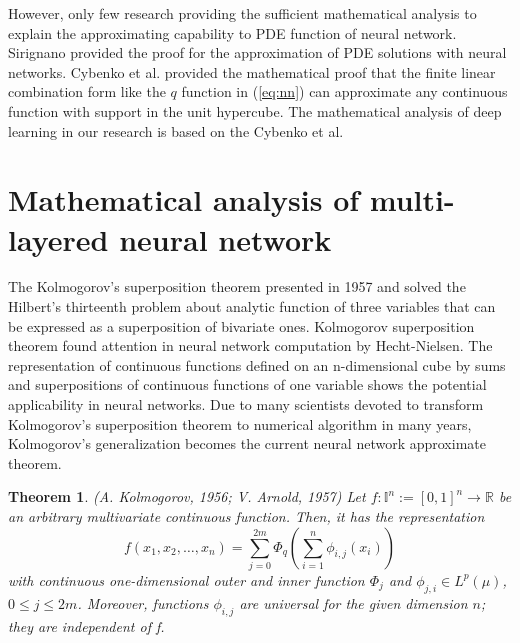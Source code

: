 \documentclass{article}
\newtheorem{theorem}{Theorem}[section]
\begin{document}
However, only few research providing the sufficient mathematical analysis to explain the approximating capability to PDE function of neural network. 
Sirignano \cite{sirignano} provided the proof for the approximation of PDE solutions with neural networks. 
Cybenko  et al.   \cite{cybenko} provided the mathematical proof that the finite linear combination form like the $q$ function in (\ref{eq:nn})
can approximate any continuous function with support in the unit hypercube.
The mathematical analysis of deep learning in our research is based on the Cybenko et al. 





\section{Mathematical analysis of multi-layered neural network}
 The Kolmogorov's superposition theorem presented in 1957 and solved the Hilbert's thirteenth problem \footnotemark about analytic function of three variables that can be expressed as a superposition of bivariate ones.
Kolmogorov superposition theorem found attention in neural network computation by Hecht{-}Nielsen\cite{nielsen}.
The representation of continuous functions defined on an n{-}dimensional cube by sums and superpositions of continuous functions of one variable shows the potential applicability in neural networks\cite{kurkova}.
Due to many scientists devoted to transform Kolmogorov's superposition theorem to numerical algorithm in many years,
Kolmogorov's generalization becomes the current neural network approximate theorem.


\begin{theorem}
	 (\textit{A. Kolmogorov, 1956; V. Arnold, 1957}) Let $f : \mathbb{I}^{n} := [0,1]^{n} \rightarrow\mathbb{R}$ be an arbitrary multivariate continuous function. Then, it has the representation
	 \begin{equation}
	 f(x_1,x_2, \dots, x_n)=\sum_{j=0}^{2m}\Phi_{q}\left(\sum_{i=1}^{n}\phi_{i,j}(x_i)\right)
	 \label{eq:komo}
	 \end{equation}
	 with continuous one-dimensional outer and inner function $\Phi_{j}$ and $\phi_{j,i}\in L^p(\mu)$, $0\le j\le 2m$.
Moreover, functions $\phi_{i,j}$ are universal for the given dimension $n$; they are independent of f.
	\end{theorem}
\end{document}
